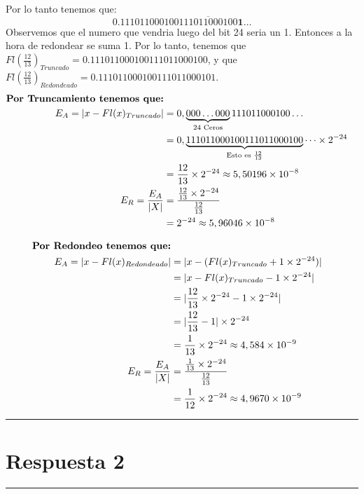 \documentclass{article}
\begin{document}
Por lo tanto tenemos que:
\begin{equation*}
	0.111011000100\overline{111011000100}\textbf{1}\dots
\end{equation*}
Observemos que el numero que vendria luego del bit 24 seria un 1. Entonces a la hora de redondear se suma 1.
Por lo tanto, tenemos que $Fl(\frac{12}{13})_{Truncado} = 0.111011000100111011000100$, 
y que $Fl(\frac{12}{13})_{Redondeado} = 0.111011000100111011000101$.
\begin{align*} %
	\text{\textbf{Por Truncamiento tenemos que:}} \\
	E_{A} = |x - Fl(x)_{Truncado}| & = 0, \underbrace{000\dots000}_\text{24 Ceros}111011000100\dots \\
	& = 0,\underbrace{111011000100111011000100}_\text{Esto es $\frac{12}{13}$}\dots \times 2^{-24} \\
	& = \frac{12}{13} \times 2^{-24} \approx 5,50196 \times 10^{-8} \\
	E_{R} = \frac{E_{A}}{|X|} & = \frac{\frac{12}{13} \times 2^{-24}}{\frac{12}{13}} \\
	& = 2^{-24} \approx 5,96046 \times 10^{-8}
\end{align*}

\begin{align*}
\text{\textbf{Por Redondeo tenemos que:}} \\
E_{A} = |x - Fl(x)_{Redondeado}| & = |x - (Fl(x)_{Truncado} + 1 \times 2^{-24})| \\
& = |x - Fl(x)_{Truncado} - 1 \times 2^{-24}| \\
& = |\frac{12}{13} \times 2^{-24} - 1 \times 2^{-24}|  \\
& = |\frac{12}{13} - 1| \times 2^{-24} \\
& = \frac{1}{13} \times 2^{-24} \approx 4,584 \times 10^{-9} \\
E_{R} = \frac{E_{A}}{|X|} & = \frac{\frac{1}{13} \times 2^{-24}}{\frac{12}{13}} \\
& = \frac{1}{12} \times 2^{-24} \approx 4,9670 \times 10^{-9}
\end{align*}


\hrule
\section*{Respuesta 2}



\hrule
\end{document}
